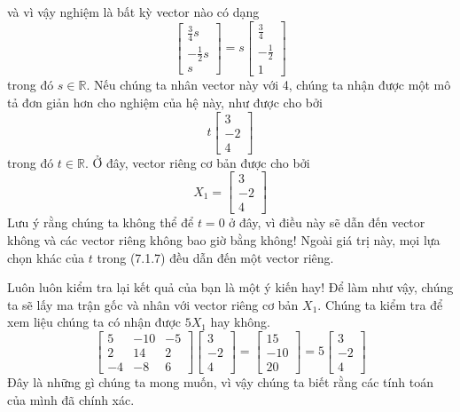 và vì vậy nghiệm là bất kỳ vector nào có dạng
\begin{equation*}
\begin{bmatrix}\frac{3}{4}s\\ -\frac{1}{2}s\\ s\end{bmatrix}=s\begin{bmatrix}\frac{3}{4}\\ -\frac{1}{2}\\ 1\end{bmatrix}
\end{equation*}
trong đó $s\in\mathbb{R}$. Nếu chúng ta nhân vector này với 4, chúng ta nhận được một mô tả đơn giản hơn cho nghiệm của hệ này, như được cho bởi
\begin{equation*}
t\begin{bmatrix}3\\ -2\\ 4\end{bmatrix}
\end{equation*}
trong đó $t\in\mathbb{R}$. Ở đây, vector riêng cơ bản được cho bởi
\begin{equation}
X_{1}=\begin{bmatrix}3\\ -2\\ 4\end{bmatrix}
\end{equation}
Lưu ý rằng chúng ta không thể để $t=0$ ở đây, vì điều này sẽ dẫn đến vector không và các vector riêng không bao giờ bằng không! Ngoài giá trị này, mọi lựa chọn khác của $t$ trong (7.1.7) đều dẫn đến một vector riêng.

Luôn luôn kiểm tra lại kết quả của bạn là một ý kiến hay! Để làm như vậy, chúng ta sẽ lấy ma trận gốc và nhân với vector riêng cơ bản $X_{1}$. Chúng ta kiểm tra để xem liệu chúng ta có nhận được $5X_{1}$ hay không.
\begin{equation*}
\begin{bmatrix}5&-10&-5\\ 2&14&2\\ -4&-8&6\end{bmatrix}\begin{bmatrix}3\\ -2\\ 4\end{bmatrix}=\begin{bmatrix}15\\ -10\\ 20\end{bmatrix}=5\begin{bmatrix}3\\ -2\\ 4\end{bmatrix}
\end{equation*}
Đây là những gì chúng ta mong muốn, vì vậy chúng ta biết rằng các tính toán của mình đã chính xác.

